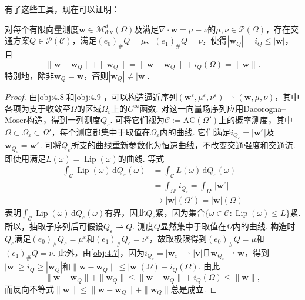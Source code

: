有了这些工具，现在可以证明：
\begin{theorem}\label{obj:4.10}
对每个有限向量测度$\mathbf w\in\mathscr M^d_{\mathrm{div}}(\Omega)$及满足$\nabla\cdot\mathbf w=\mu-\nu$的$\mu,\nu\in\mathscr P(\Omega)$，存在交通方案$Q\in\mathscr P(\mathscr C)$，满足$(e_0)_\#Q=\mu$、$(e_1)_\#Q=\nu$，使得$|\mathbf w_Q|=i_Q\leq|\mathbf w|$，且
\[
 \|\mathbf w-\mathbf w_Q\|+\|\mathbf w_Q\|
 =\|\mathbf w-\mathbf w_Q\|+i_Q(\Omega)=\|\mathbf w\|.
\]
特别地，除非$\mathbf w_Q=\mathbf w$，否则$|\mathbf w_Q|\neq|\mathbf w|$.
\end{theorem}
\begin{proof}
由\autoref{obj:4.8}和\autoref{obj:4.9}，可以构造逼近序列$(\mathbf w^\varepsilon,\mu^\varepsilon,\nu^\varepsilon)\rightharpoonup(\mathbf w,\mu,\nu)$，其中各项为支于收敛至$\Omega$的区域$\Omega_\varepsilon$上的$C^\infty$函数. 对这一向量场序列应用Dacorogna--Moser构造，得到一列测度$Q_\varepsilon$. 可将它们视为$\mathscr C:=\mathrm{AC}(\Omega')$上的概率测度，其中$\Omega\subset\Omega_\varepsilon\subset\Omega'$，每个测度都集中于取值在$\Omega_\varepsilon$内的曲线. 它们满足$i_{Q_\varepsilon}=|\mathbf w^\varepsilon|$及$\mathbf w_{Q_\varepsilon}=\mathbf w^\varepsilon$. 可将$Q_\varepsilon$所支的曲线重新参数化为恒速曲线，不改变交通强度和交通流. 即使用满足$L(\omega)=\operatorname{Lip}(\omega)$的曲线. 等式
\begin{equation*}
\begin{aligned}
 \int_{\mathscr C}\operatorname{Lip}(\omega)\,\mathrm dQ_\varepsilon(\omega)
 &=\int_{\mathscr C}L(\omega)\,\mathrm dQ_\varepsilon(\omega)\\
 &=\int_{\Omega'}i_{Q_\varepsilon}
  =\int_{\Omega'}|\mathbf w^\varepsilon|\\
 &\to|\mathbf w|(\Omega')=|\mathbf w|(\Omega)
\end{aligned}
\end{equation*}
表明$\int_{\mathscr C}\operatorname{Lip}(\omega)\,\mathrm dQ_\varepsilon(\omega)$有界，因此$Q_\varepsilon$紧，因为集合$\{\omega\in\mathscr C:\operatorname{Lip}(\omega)\leq L\}$紧. 所以，抽取子序列后可假设$Q_\varepsilon\rightharpoonup Q$. 测度$Q$显然集中于取值在$\Omega$内的曲线. 构造时$Q_\varepsilon$满足$(e_0)_\#Q_\varepsilon=\mu^\varepsilon$和$(e_1)_\#Q_\varepsilon=\nu^\varepsilon$，故取极限得到$(e_0)_\#Q=\mu$和$(e_1)_\#Q=\nu$. 此外，由\autoref{obj:4.7}，因为$i_{Q_\varepsilon}=|\mathbf w_\varepsilon|\rightharpoonup|\mathbf v|$且$\mathbf w_{Q_\varepsilon}\rightharpoonup\mathbf w$，得到$|\mathbf w|\geq i_Q\geq|\mathbf w_Q|$和$\|\mathbf w-\mathbf w_Q\|\leq|\mathbf w|(\Omega)-i_Q(\Omega)$. 由此
\[
 \|\mathbf w-\mathbf w_Q\|+\|\mathbf w_Q\|
 \leq\|\mathbf w-\mathbf w_Q\|+i_Q(\Omega)\leq\|\mathbf w\|,
\]
而反向不等式$\|\mathbf w\|\leq\|\mathbf w-\mathbf w_Q\|+\|\mathbf w_Q\|$总是成立.
\end{proof}

